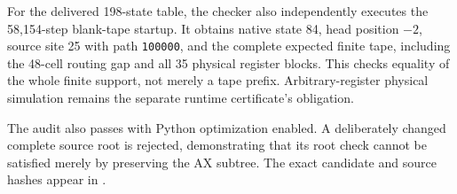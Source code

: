 For the delivered 198-state table, the checker also independently
executes the 58,154-step blank-tape startup. It obtains native state
84, head position $-2$, source site 25 with path
\texttt{100000}, and the complete expected finite tape, including
the 48-cell routing gap and all 35 physical register blocks. This
checks equality of the whole finite support, not merely a tape
prefix. Arbitrary-register physical simulation remains the separate
runtime certificate's obligation.

The audit also passes with Python optimization enabled. A deliberately
changed complete source root is rejected, demonstrating that its
root check cannot be satisfied merely by preserving the AX subtree.
The exact candidate and source hashes appear in
.
